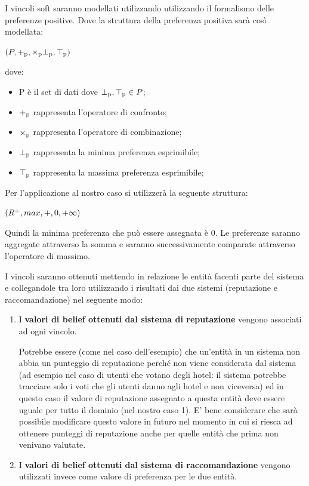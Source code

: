 \documentclass{report}
\begin{document}
	I vincoli soft saranno modellati utilizzando utilizzando il formalismo delle preferenze positive. Dove la struttura della preferenza positiva sarà così modellata:
	\newline
	
    $(P, +\textsubscript{p}, \times\textsubscript{p} \bot\textsubscript{p}, \top\textsubscript{p})$
    \newline
    
    dove:
    \begin{itemize}
		\item
		P è il set di dati dove $\bot\textsubscript{p}, \top\textsubscript{p} \in P$;
		\item
		$+\textsubscript{p}$ rappresenta l'operatore di confronto;
		\item
		$\times\textsubscript{p}$ rappresenta l'operatore di combinazione;
		\item
		$\bot\textsubscript{p}$ rappresenta la minima preferenza esprimibile;
		\item
		$\top\textsubscript{p}$ rappresenta la massima preferenza esprimibile;
	\end{itemize}
	

    Per l'applicazione al nostro caso si utilizzerà la seguente struttura:
    \newline
    
    $(R\textsuperscript{+}, max, +, 0, +\infty)$
    \newline
    
	Quindi la minima preferenza che può essere assegnata è 0. Le preferenze saranno aggregate attraverso la somma e saranno successivamente comparate attraverso l'operatore di massimo. 
	\newpage
	
	I vincoli saranno ottenuti mettendo in relazione le entità facenti parte del sistema e collegandole tra loro utilizzando i risultati dai due sistemi (reputazione e raccomandazione) nel seguente modo:
	
	\begin{enumerate}
	    \item 
	    I \textbf{valori di belief ottenuti dal sistema di reputazione} vengono associati ad ogni vincolo. 

        Potrebbe essere (come nel caso dell'esempio) che un'entità in un sistema non abbia un punteggio di reputazione perché non viene considerata dal sistema (ad esempio nel caso di utenti che votano degli hotel: il sistema potrebbe tracciare solo i voti che gli utenti danno agli hotel e non viceversa) ed in questo caso il valore di reputazione assegnato a questa entità deve essere uguale per tutto il dominio (nel nostro caso 1). E' bene considerare che sarà possibile modificare questo valore in futuro nel momento in cui si riesca ad ottenere punteggi di reputazione anche per quelle entità che prima non venivano valutate.
        \item
        I \textbf{valori di belief ottenuti dal sistema di raccomandazione} vengono utilizzati invece come valore di preferenza per le due entità.
	\end{enumerate}
	
\end{document}
